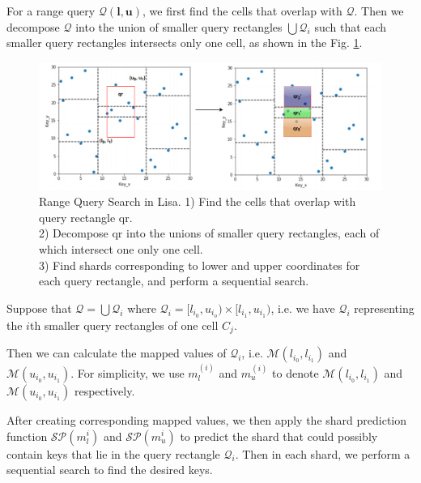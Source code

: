For a range query $\mathcal{Q}(\boldsymbol{l},\boldsymbol{u})$, we first find the cells that overlap with $\mathcal{Q}$. Then we decompose $\mathcal{Q}$ into the union of smaller query rectangles $\bigcup \mathcal{Q}_i$ such that each smaller query rectangles intersects only one cell, as shown in the Fig. \ref{fig:Range_Query_Lisa}.

\begin{figure}[t]
    \centering
    \includegraphics[width=1\textwidth]{graphs/range_query_lisa.png}
    \caption{Range Query Search in Lisa.
    1) Find the cells that overlap with query rectangle qr. \\
    2) Decompose qr into the unions of smaller query rectangles, each of which intersect one only one cell. \\
    3) Find shards corresponding to lower and upper coordinates for each query rectangle, and perform a sequential search. }
    \label{fig:Range_Query_Lisa}
\end{figure}

 Suppose that $\mathcal{Q}=\bigcup \mathcal{Q}_i$ where $\mathcal{Q}_i=[l_{i_0}, u_{i_o})\times [l_{i_1}, u_{i_1})$, i.e. we have $\mathcal{Q}_i$ representing the $i$th smaller query rectangles of one cell $C_j$.
 
 Then we can calculate the mapped values of $\mathcal{Q}_i$, i.e. $\mathcal{M}(l_{i_0}, l_{i_1})$ and $\mathcal{M}(u_{i_0}, u_{i_1})$. For simplicity, we use $m_l^{(i)}$ and $m_u^{(i)}$ to denote $\mathcal{M}(l_{i_0}, l_{i_1})$ and $\mathcal{M}(u_{i_0}, u_{i_1})$ respectively.
 
After creating corresponding mapped values, we then apply the shard prediction function $\mathcal{SP}(m_{l}^{i})$ and $\mathcal{SP}(m_{u}^{i})$ to predict the shard that could possibly contain keys that lie in the query rectangle $\mathcal{Q}_i$. Then in each shard, we perform a sequential search to find the desired keys. 

